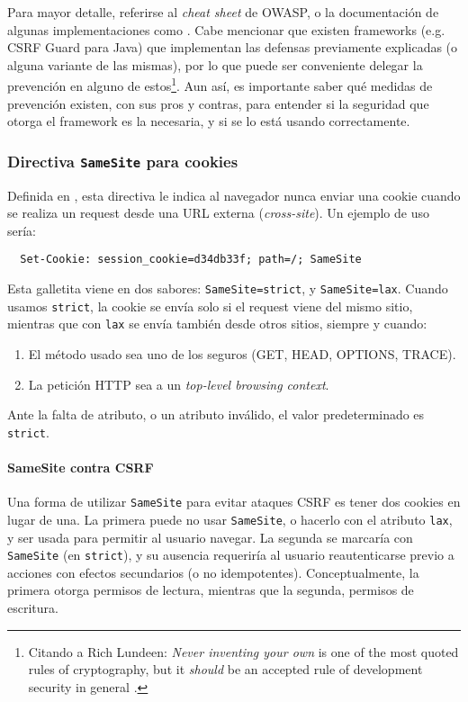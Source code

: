 \documentclass{article}
\theoremstyle{definition}
\begin{document}
Para mayor detalle, referirse al \textit{cheat sheet} de OWASP, o la
documentación de algunas implementaciones como \cite{django, django2}. Cabe
mencionar que existen frameworks (e.g.  CSRF Guard para Java) que implementan
las defensas previamente explicadas (o alguna variante de las mismas), por lo
que puede ser conveniente delegar la prevención en alguno de
estos\footnote{Citando a Rich Lundeen: \textit{Never inventing your own} is one
of the most quoted rules of cryptography, but it \textit{should} be an accepted
rule of development security in general \cite{Lundeen13}.}. Aun así, es importante saber qué
medidas de prevención existen, con sus pros y contras, para entender si la
seguridad que otorga el framework es la necesaria, y si se lo está usando
correctamente.



\subsubsection{Directiva \texttt{SameSite} para cookies}
Definida en \cite{ietf}, esta directiva le indica al navegador nunca enviar una cookie cuando se realiza
un request desde una URL externa (\textit{cross-site}). Un ejemplo de uso sería:
\begin{verbatim}
  Set-Cookie: session_cookie=d34db33f; path=/; SameSite
\end{verbatim}

Esta galletita viene en dos sabores: \verb+SameSite=strict+, y
\verb+SameSite=lax+. Cuando usamos \verb+strict+, la cookie se envía solo si el request viene del
mismo sitio, mientras que con \verb+lax+ se envía también desde otros sitios,
siempre y cuando:
\begin{enumerate}
  \item El método usado sea uno de los seguros (GET, HEAD, OPTIONS, TRACE).
  \item La petición HTTP sea a un \textit{top-level browsing context}.
\end{enumerate}
Ante la falta de atributo, o un atributo inválido, el valor predeterminado es
\verb+strict+.

\paragraph{SameSite contra CSRF} Una forma de utilizar \verb+SameSite+ para
evitar ataques CSRF es tener dos cookies en lugar de una. La primera puede no
usar \verb+SameSite+, o hacerlo con el atributo \verb+lax+, y ser usada para
permitir al usuario navegar. La segunda se marcaría con \verb+SameSite+ (en
\verb+strict+), y su ausencia requeriría al usuario reautenticarse previo a
acciones con efectos secundarios (o no idempotentes). Conceptualmente, la
primera otorga permisos de lectura, mientras que la segunda, permisos de
escritura.
\end{document}
